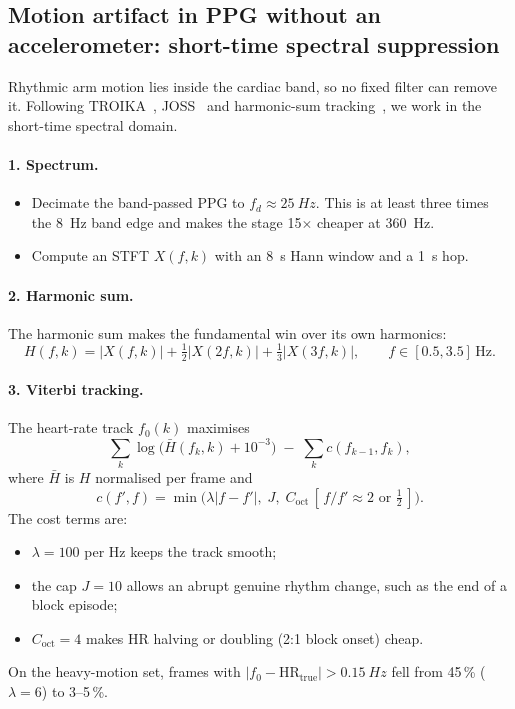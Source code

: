 \documentclass[10pt,a4paper]{article}
\begin{document}
\subsection{Motion artifact in PPG without an accelerometer: short-time spectral suppression}\label{sec:ms}
Rhythmic arm motion lies inside the cardiac band, so no fixed filter can remove it. Following
TROIKA~\cite{troika}, JOSS~\cite{joss} and harmonic-sum tracking~\cite{hss}, we work in the short-time spectral domain.

\paragraph{1. Spectrum.}
\begin{itemize}
  \item Decimate the band-passed PPG to $f_d\approx\SI{25}{Hz}$. This is at least three times the \SI{8}{Hz} band edge
        and makes the stage 15$\times$ cheaper at \SI{360}{Hz}.
  \item Compute an STFT $X(f,k)$ with an \SI{8}{s} Hann window and a \SI{1}{s} hop.
\end{itemize}

\paragraph{2. Harmonic sum.}
The harmonic sum makes the fundamental win over its own harmonics:
\begin{equation}
  H(f,k) = |X(f,k)| + \tfrac12|X(2f,k)| + \tfrac13|X(3f,k)|, \qquad f\in[0.5, 3.5]\,\mathrm{Hz}.
\end{equation}

\paragraph{3. Viterbi tracking.}
The heart-rate track $f_0(k)$ maximises
\begin{equation}
  \sum_k \log\big(\bar H(f_k,k)+10^{-3}\big) \;-\; \sum_k c(f_{k-1},f_k),
\end{equation}
where $\bar H$ is $H$ normalised per frame and
\begin{equation}
  c(f',f) = \min\big(\lambda|f-f'|,\; J,\; C_{\mathrm{oct}}\,[\,f/f'\approx 2 \text{ or } \tfrac12\,]\big).
  \label{eq:viterbi}
\end{equation}
The cost terms are:
\begin{itemize}
  \item $\lambda=100$ per Hz keeps the track smooth;
  \item the cap $J=10$ allows an abrupt genuine rhythm change, such as the end of a block episode;
  \item $C_{\mathrm{oct}}=4$ makes HR halving or doubling (2:1 block onset) cheap.
\end{itemize}
On the heavy-motion set, frames with $|f_0-\mathrm{HR}_{\mathrm{true}}|>\SI{0.15}{Hz}$ fell from 45\,\% ($\lambda=6$)
to 3--5\,\%.
\end{document}
